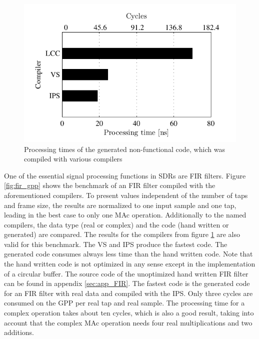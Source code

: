 \begin{figure}[htbp]
	\centering
		\includegraphics{../kapitel02/figures/empty_loop_gpp.pdf}
	\caption{Processing times of the generated non-functional code, which was compiled with various compilers}
	\label{fig:empty_loop_gpp}
\end{figure}

One of the essential signal processing functions in SDRs are \ac{FIR} filters. Figure \ref{fig:fir_gpp} shows the benchmark of an \ac{FIR} filter compiled with the aforementioned compilers. To present values independent of the number of taps and frame size, the results are normalized to one input sample and one tap, leading in the best case to only one \ac{MAc} operation. Additionally to the named compilers, the data type (real or complex) and the code (hand written or generated) are compared. The results for the compilers from figure \ref{fig:empty_loop_gpp} are also valid for this benchmark. The \ac{VS} and \ac{IPS} produce the fastest code. The generated code consumes always less time than the hand written code. Note that the hand written code is not optimized in any sense except in the implementation of a circular buffer. The source code of the unoptimized hand written FIR filter can be found in appendix \ref{sec:app_FIR}. The fastest code is the generated code for an \ac{FIR} filter with real data and compiled with the \ac{IPS}. Only three cycles are consumed on the GPP per real tap and real sample. The processing time for a complex operation takes about ten cycles, which is also a good result, taking into account that the complex \ac{MAc} operation needs four real multiplications and two additions.

